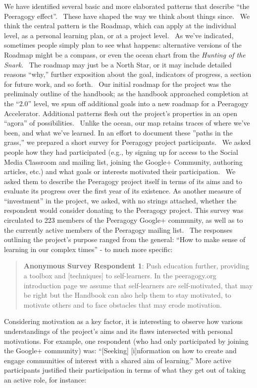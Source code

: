 We have identified several basic and more elaborated patterns that
describe ``the Peeragogy effect''.~ These have shaped the way we think
about things since.~ We think the central pattern is the Roadmap, which
can apply at the individual level, as a personal learning plan, or at a
project level.~ As we've indicated, sometimes people simply plan to see
what happens: alternative versions of the Roadmap might be a compass, or
even the ocean chart from the \emph{Hunting of the Snark}.~ The roadmap
may just be a North Star, or it may include detailed reasons ``why,''
further exposition about the goal, indicators of progress, a section for
future work, and so forth.~ Our initial roadmap for the project was the
preliminaly outline of the handbook; as the handbook approached
completion at the ``2.0'' level, we spun off additional goals into a new
roadmap for a Peeragogy Accelerator. Additional patterns flesh out the
project's properties in an open ``agora'' of possibilities.~ Unlike the
ocean, our map retains traces of where we've been, and what we've
learned. In an effort to document these ''paths in the grass,'' we
prepared a short survey for Peeragogy project participants.~ We asked
people how they had participated (e.g., by signing up for access to the
Social Media Classroom and mailing list, joining the Google+ Community,
authoring articles, etc.) and what goals or interests motivated their
participation.~ We asked them to describe the Peeragogy project itself
in terms of its aims and to evaluate its progress over the first year of
its existence. As another measure of ``investment'' in the project, we
asked, with no strings attached, whether the respondent would consider
donating to the Peeragogy project. This survey was circulated to 223
members of the Peeragogy Google+ community, as well as to the currently
active members of the Peeragogy mailing list.~ The responses outlining
the project's purpose ranged from the general: ``How to make sense of
learning in our complex times'' - to much more specific:

\begin{quote}
\textbf{Anonymous Survey Respondent 1}: Push education further,
providing a toolbox and {[}techniques{]} to self-learners. In the
peeragogy.org introduction page we assume that self-learners are
self-motivated, that may be right but the Handbook can also help them to
stay motivated, to motivate others and to face obstacles that may erode
motivation.
\end{quote}

Considering motivation as a key factor, it is interesting to observe how
various understandings of the project's aims and its flaws intersected
with personal motivations. For example, one respondent (who had only
participated by joining the Google+ community) was: ``{[}Seeking{]}
{[}i{]}nformation on how to create and engage communities of interest
with a shared aim of learning.'' More active participants justified
their participation in terms of what they get out of taking an active
role, for instance:


